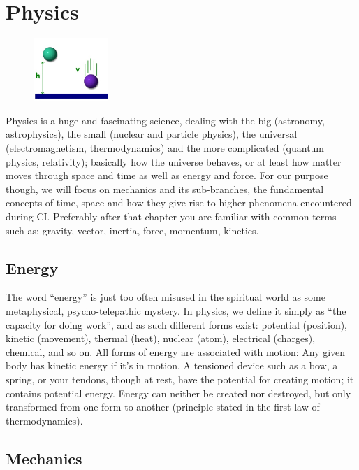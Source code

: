 \section{Physics}\label{sec:physics}

\begin{figure}
    \centering
    \includegraphics[width=0.25\textwidth]{images/physics}
\end{figure}

Physics is a huge and fascinating science, dealing with the big (astronomy, astrophysics), the small (nuclear and particle physics), the universal (electromagnetism, thermodynamics) and the more complicated (quantum physics, relativity); basically how the universe behaves, or at least how matter moves through space and time as well as energy and force.
For our purpose though, we will focus on mechanics and its sub-branches, the fundamental concepts of time, space and how they give rise to higher phenomena encountered during CI\@.
Preferably after that chapter you are familiar with common terms such as: gravity, vector, inertia, force, momentum, kinetics.

\subsection{Energy}\label{subsec:energy}

The word ``energy'' is just too often misused in the spiritual world as some metaphysical, psycho-telepathic mystery.
In physics, we define it simply as ``the capacity for doing work'', and as such different forms exist: potential (position), kinetic (movement), thermal (heat), nuclear (atom), electrical (charges), chemical, and so on.
All forms of energy are associated with motion: Any given body has kinetic energy if it's in motion.
A tensioned device such as a bow, a spring, or your tendons, though at rest, have the potential for creating motion; it contains potential energy.
Energy can neither be created nor destroyed, but only transformed from one form to another (principle stated in the first law of thermodynamics).

\subsection{Mechanics}\label{subsec:mechanics}


